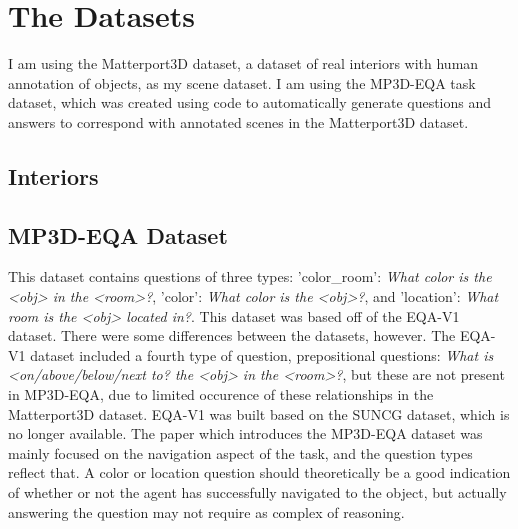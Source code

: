 \section{The Datasets}
I am using the Matterport3D dataset, a dataset of real interiors with human annotation of objects, as my scene dataset\cite{matterport}. 
I am using the MP3D-EQA task dataset, which was created using code to automatically generate questions and answers to correspond with annotated scenes in the Matterport3D dataset\cite{eqa_matterport}. 


\subsection{Interiors}

\subsection{MP3D-EQA Dataset} 
This dataset contains questions of three types: 'color\_room': \emph{What color is the <obj> in the <room>?}, 'color': \emph{What color is the <obj>?}, and 'location': \emph{What room is the <obj> located in?}. This dataset was based off of the EQA-V1 dataset\cite{embodiedqa}. There were some differences between the datasets, however. The EQA-V1 dataset included a fourth type of question, prepositional questions: \emph{What is <on/above/below/next to? the <obj> in the <room>?}, but these are not present in MP3D-EQA, due to limited occurence of these relationships in the Matterport3D dataset. %
EQA-V1 was built based on the SUNCG dataset, which is no longer available. %
The paper which introduces the MP3D-EQA dataset was mainly focused on the navigation aspect of the task, and the question types reflect that. A color or location question should theoretically be a good indication of whether or not the agent has successfully navigated to the object, but actually answering the question may not require as complex of reasoning. 

